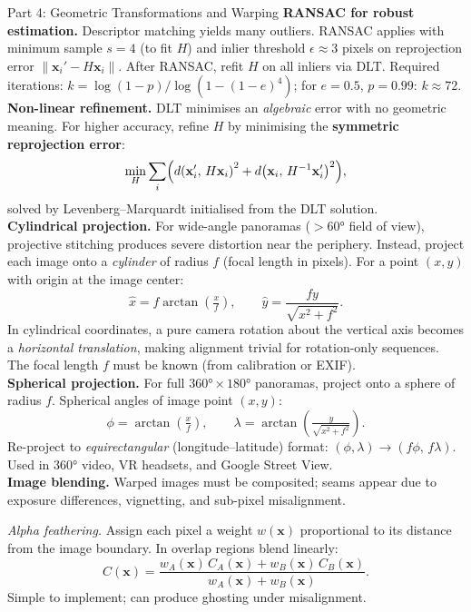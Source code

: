 \documentclass[letterpaper]{article}
\begin{document}
\begin{notes}{Part 4: Geometric Transformations and Warping}
\textbf{RANSAC for robust estimation.} Descriptor matching yields many outliers. RANSAC applies with minimum sample $s=4$ (to fit $H$) and inlier threshold $\epsilon \approx 3$ pixels on reprojection error $\|\mathbf{x}_i' - H\mathbf{x}_i\|$. After RANSAC, refit $H$ on all inliers via DLT. Required iterations: $k = \log(1-p)/\log(1-(1-e)^4)$; for $e=0.5$, $p=0.99$: $k\approx72$.\\

\textbf{Non-linear refinement.} DLT minimises an \emph{algebraic} error with no geometric meaning. For higher accuracy, refine $H$ by minimising the \textbf{symmetric reprojection error}:
$$\min_H \sum_i \Bigl(d\!\left(\mathbf{x}_i',\,H\mathbf{x}_i\right)^2 + d\!\left(\mathbf{x}_i,\,H^{-1}\mathbf{x}_i'\right)^2\Bigr),$$
solved by Levenberg--Marquardt initialised from the DLT solution.\\

\textbf{Cylindrical projection.} For wide-angle panoramas ($>\!60°$ field of view), projective stitching produces severe distortion near the periphery. Instead, project each image onto a \emph{cylinder} of radius $f$ (focal length in pixels). For a point $(x,y)$ with origin at the image center:
$$\hat{x} = f\arctan\!\left(\tfrac{x}{f}\right), \qquad \hat{y} = \frac{fy}{\sqrt{x^2+f^2}}.$$
In cylindrical coordinates, a pure camera rotation about the vertical axis becomes a \emph{horizontal translation}, making alignment trivial for rotation-only sequences. The focal length $f$ must be known (from calibration or EXIF).\\

\textbf{Spherical projection.} For full $360°\times180°$ panoramas, project onto a sphere of radius $f$. Spherical angles of image point $(x,y)$:
$$\phi = \arctan\!\left(\tfrac{x}{f}\right), \qquad \lambda = \arctan\!\left(\tfrac{y}{\sqrt{x^2+f^2}}\right).$$
Re-project to \emph{equirectangular} (longitude--latitude) format: $(\phi,\lambda)\to(f\phi,\,f\lambda)$. Used in 360° video, VR headsets, and Google Street View.\\

\textbf{Image blending.} Warped images must be composited; seams appear due to exposure differences, vignetting, and sub-pixel misalignment.

\textit{Alpha feathering.} Assign each pixel a weight $w(\mathbf{x})$ proportional to its distance from the image boundary. In overlap regions blend linearly:
$$C(\mathbf{x}) = \frac{w_A(\mathbf{x})\,C_A(\mathbf{x}) + w_B(\mathbf{x})\,C_B(\mathbf{x})}{w_A(\mathbf{x}) + w_B(\mathbf{x})}.$$
Simple to implement; can produce ghosting under misalignment.


\end{notes}
\end{document}
